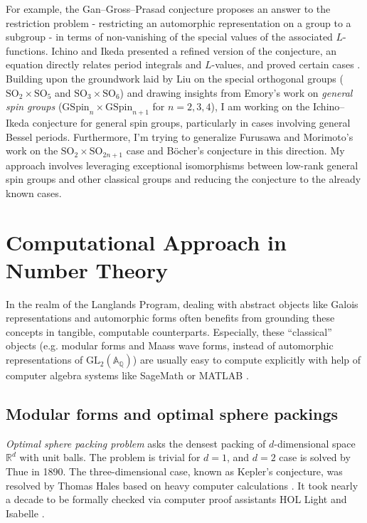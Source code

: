 \documentclass[12pt]{article}
\begin{document}
For example, the Gan--Gross--Prasad conjecture \cite{gan2011symplectic} proposes an answer to the restriction problem - restricting an automorphic representation on a group to a subgroup - in terms of non-vanishing of the special values of the  associated $L$-functions. 
Ichino and Ikeda presented a refined version of the conjecture, an equation directly relates period integrals and $L$-values, and proved certain cases \cite{ichino2010periods}. 
Building upon the groundwork laid by Liu \cite{liu2016refined} on the special orthogonal groups ($\mathrm{SO}_{2} \times \mathrm{SO}_{5}$ and $\mathrm{SO}_{3} \times \mathrm{SO}_{6}$) and drawing insights from Emory's work \cite{emory2020global} on \emph{general spin groups} ($\mathrm{GSpin}_{n} \times \mathrm{GSpin}_{n+1}$ for $n = 2, 3, 4$), I am working on the Ichino--Ikeda conjecture for general spin groups, particularly in cases involving general Bessel periods.
Furthermore, I'm trying to generalize Furusawa and Morimoto's work on the $\mathrm{SO}_{2} \times \mathrm{SO}_{2n+1}$ case and B\"ocher's conjecture \cite{furusawa2020refined} in this direction.
My approach involves leveraging exceptional isomorphisms between low-rank general spin groups and other classical groups and reducing the conjecture to the already known cases.


\section*{Computational Approach in Number Theory}


In the realm of the Langlands Program, dealing with abstract objects like Galois representations and automorphic forms often benefits from grounding these concepts in tangible, computable counterparts.
Especially, these ``classical'' objects (e.g. modular forms and Maass wave forms, instead of automorphic representations of $\mathrm{GL}_{2}(\mathbb{A}_{\mathbb{Q}})$) are usually easy to compute explicitly with help of computer algebra systems like SageMath \cite{sagemath} or MATLAB \cite{MATLAB}.



\subsection*{Modular forms and optimal sphere packings}

\emph{Optimal sphere packing problem} asks the densest packing of $d$-dimensional space $\mathbb{R}^{d}$ with unit balls.
The problem is trivial for $d = 1$, and $d = 2$ case is solved by Thue in 1890.
The three-dimensional case, known as Kepler's conjecture, was resolved by Thomas Hales based on heavy computer calculations \cite{hales2005proof}.
It took nearly a decade to be formally checked via computer proof assistants HOL Light and Isabelle \cite{hales2017formal}.
\end{document}
